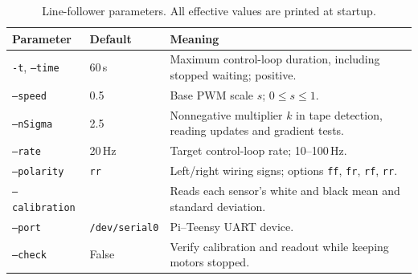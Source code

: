 \begin{table}[H]
\centering\small
\caption{Line-follower parameters. All effective values are printed at startup.}
\label{tab:lf-parameters}
\begin{tabular}{@{}L{3.4cm}L{3.2cm}L{9.5cm}@{}}
\toprule
\textbf{Parameter} & \textbf{Default} & \textbf{Meaning} \\
\midrule
\texttt{-t}, \texttt{--time} & 60\,s & Maximum control-loop duration, including stopped waiting; positive. \\
\texttt{--speed} & 0.5 & Base PWM scale $s$; $0\le s\le1$. \\
\texttt{--nSigma} & 2.5 & Nonnegative multiplier $k$ in tape detection, reading updates and gradient tests. \\
\texttt{--rate} & 20\,Hz & Target control-loop rate; 10--100\,Hz. \\
\texttt{--polarity} & \texttt{rr} & Left/right wiring signs; options \texttt{ff}, \texttt{fr}, \texttt{rf}, \texttt{rr}. \\
\texttt{--calibration} &  & Reads each sensor's white and black mean and standard deviation. \\
\texttt{--port} & \texttt{/dev/serial0} & Pi--Teensy UART device. \\
\texttt{--check} & False & Verify calibration and readout while keeping motors stopped. \\
\bottomrule
\end{tabular}
\end{table}
